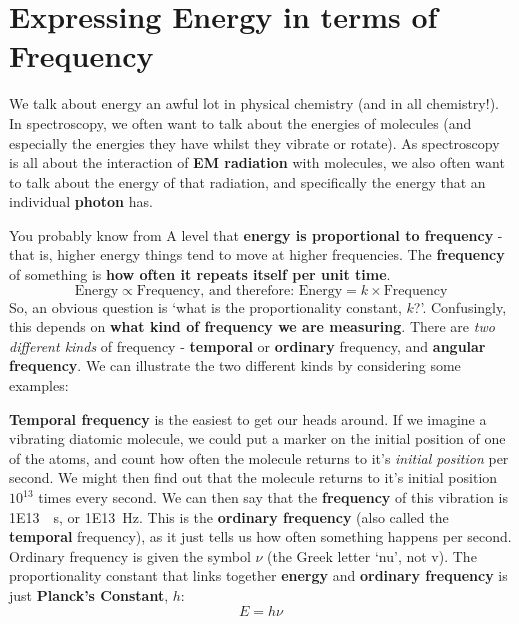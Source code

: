 \documentclass{memoir}[11pt,oneside,a4paper,openany]
\begin{document}
\chapter{Expressing Energy in terms of Frequency}\label{app:energies}
We talk about energy an awful lot in physical chemistry (and in all chemistry!). In spectroscopy, we often want to talk about the energies of molecules (and especially the energies they have whilst they vibrate or rotate). As spectroscopy is all about the interaction of \textbf{EM radiation} with molecules, we also often want to talk about the energy of that radiation, and specifically the energy that an individual \textbf{photon} has. 

You probably know from A level that \textbf{energy is proportional to frequency} - that is, higher energy things tend to move at higher frequencies. The \textbf{frequency} of something is \textbf{how often it repeats itself per unit time}. 
\begin{equation}
	\text{Energy} \propto \text{Frequency} \text{, and therefore: Energy} = k\times\text{Frequency}
\end{equation}
So, an obvious question is `what is the proportionality constant, $k$?'. Confusingly, this depends on \textbf{what kind of frequency we are measuring}. There are \emph{two different kinds} of frequency - \textbf{temporal} or \textbf{ordinary} frequency, and \textbf{angular frequency}. We can illustrate the two different kinds by considering some examples:

\textbf{Temporal frequency} is the easiest to get our heads around. If we imagine a vibrating diatomic molecule, we could put a marker on the initial position of one of the atoms, and count how often the molecule returns to it's \textit{initial position} per second. We might then find out that the molecule returns to it's initial position $10^{13}$ times every second. We can then say that the \textbf{frequency} of this vibration is \SI{1E13}{\per\second}, or \SI{1E13}{\hertz}. This is the \textbf{ordinary frequency} (also called the \textbf{temporal} frequency), as it just tells us how often something happens per second. Ordinary frequency is given the symbol $\nu$ (the Greek letter `nu', not v). The proportionality constant that links together \textbf{energy} and \textbf{ordinary frequency} is just \textbf{Planck's Constant}, $h$:
\begin{equation}
	E = h\nu
\end{equation}
\end{document}

